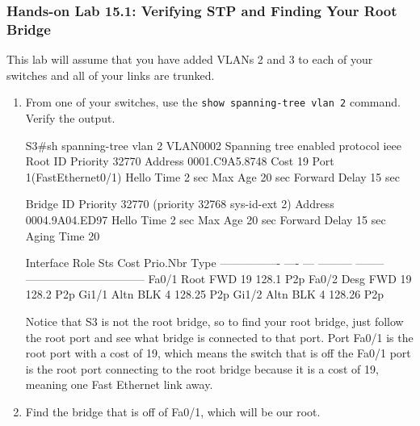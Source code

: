 \begin{figure}
\centering
\caption{}
\end{figure}

\subsubsection[Hands-on Lab 15.1: Verifying STP and Finding Your Root
Bridge]{\texorpdfstring{\protect\hypertarget{c15.xhtmlux5cux23c15-sec-25}{}{}Hands-on
Lab 15.1: Verifying STP and Finding Your Root
Bridge}{Hands-on Lab 15.1: Verifying STP and Finding Your Root Bridge}}

This lab will assume that you have added VLANs 2 and 3 to each of your
switches and all of your links are trunked.

\begin{enumerate}
\item
  From one of your switches, use the
  \texttt{show\ spanning-tree\ vlan\ 2} command. Verify the output.

\begin{cli}
S3#sh spanning-tree vlan 2
VLAN0002
  Spanning tree enabled protocol ieee
  Root ID    Priority    32770
             Address     0001.C9A5.8748
             Cost        19
             Port        1(FastEthernet0/1)
             Hello Time  2 sec  Max Age 20 sec  Forward Delay 15 sec
 
  Bridge ID  Priority    32770  (priority 32768 sys-id-ext 2)
             Address     0004.9A04.ED97
             Hello Time  2 sec  Max Age 20 sec  Forward Delay 15 sec
             Aging Time  20
\end{cli}

\begin{cli}
Interface        Role Sts Cost      Prio.Nbr Type
---------------- ---- --- --------- -------- --------------------------------
Fa0/1            Root FWD 19        128.1    P2p
Fa0/2            Desg FWD 19        128.2    P2p
Gi1/1            Altn BLK 4         128.25   P2p
Gi1/2            Altn BLK 4         128.26   P2p
\end{cli}

  Notice that S3 is not the root bridge, so to find your root bridge,
  just follow the root port and see what bridge is connected to that
  port. Port Fa0/1 is the root port with a cost of 19, which means the
  switch that is off the Fa0/1 port is the root port connecting to the
  root bridge because it is a cost of 19, meaning one Fast Ethernet link
  away.
\item
  Find the bridge that is off of Fa0/1, which will be our root.


\end{enumerate}

